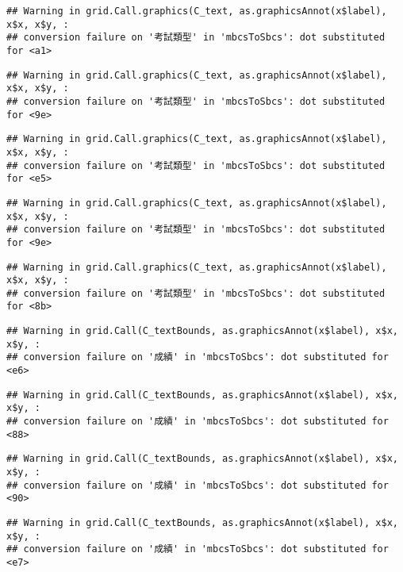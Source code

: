 \documentclass[
]{book}
\begin{document}
\begin{verbatim}
## Warning in grid.Call.graphics(C_text, as.graphicsAnnot(x$label), x$x, x$y, :
## conversion failure on '考試類型' in 'mbcsToSbcs': dot substituted for <a1>
\end{verbatim}

\begin{verbatim}
## Warning in grid.Call.graphics(C_text, as.graphicsAnnot(x$label), x$x, x$y, :
## conversion failure on '考試類型' in 'mbcsToSbcs': dot substituted for <9e>
\end{verbatim}

\begin{verbatim}
## Warning in grid.Call.graphics(C_text, as.graphicsAnnot(x$label), x$x, x$y, :
## conversion failure on '考試類型' in 'mbcsToSbcs': dot substituted for <e5>
\end{verbatim}

\begin{verbatim}
## Warning in grid.Call.graphics(C_text, as.graphicsAnnot(x$label), x$x, x$y, :
## conversion failure on '考試類型' in 'mbcsToSbcs': dot substituted for <9e>
\end{verbatim}

\begin{verbatim}
## Warning in grid.Call.graphics(C_text, as.graphicsAnnot(x$label), x$x, x$y, :
## conversion failure on '考試類型' in 'mbcsToSbcs': dot substituted for <8b>
\end{verbatim}

\begin{verbatim}
## Warning in grid.Call(C_textBounds, as.graphicsAnnot(x$label), x$x, x$y, :
## conversion failure on '成績' in 'mbcsToSbcs': dot substituted for <e6>
\end{verbatim}

\begin{verbatim}
## Warning in grid.Call(C_textBounds, as.graphicsAnnot(x$label), x$x, x$y, :
## conversion failure on '成績' in 'mbcsToSbcs': dot substituted for <88>
\end{verbatim}

\begin{verbatim}
## Warning in grid.Call(C_textBounds, as.graphicsAnnot(x$label), x$x, x$y, :
## conversion failure on '成績' in 'mbcsToSbcs': dot substituted for <90>
\end{verbatim}

\begin{verbatim}
## Warning in grid.Call(C_textBounds, as.graphicsAnnot(x$label), x$x, x$y, :
## conversion failure on '成績' in 'mbcsToSbcs': dot substituted for <e7>
\end{verbatim}
\end{document}
